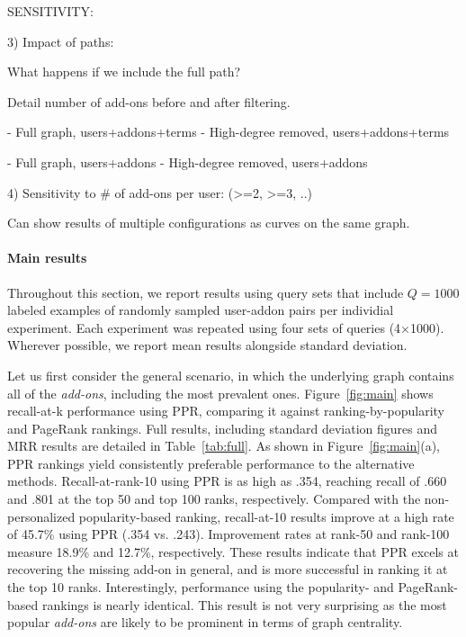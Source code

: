 \documentclass[11pt,oneside]{book}
\begin{document}
SENSITIVITY:

3) Impact of paths:

What happens if we include the full path?

Detail number of add-ons before and after filtering. 

- Full graph, users+addons+terms
- High-degree removed, users+addons+terms

- Full graph, users+addons
- High-degree removed, users+addons

4) Sensitivity to # of add-ons per user: (>=2, >=3, ..)

Can show results of multiple configurations as curves on the same graph.
\fi

\paragraph{Main results}

Throughout this section, we report results using query sets that include $Q=1000$ labeled examples of randomly sampled user-addon pairs per individial experiment. Each experiment was repeated using four sets of queries (4$\times$1000). Wherever possible, we report mean results alongside standard deviation.  

Let us first consider the general scenario, in which the underlying graph contains all of the {\it add-ons}, including the most prevalent ones. Figure~\ref{fig:main} shows recall-at-k performance using PPR, comparing it against ranking-by-popularity and PageRank rankings. Full results, including standard deviation figures and MRR results are detailed in Table~\ref{tab:full}.
As shown in Figure~\ref{fig:main}(a), PPR rankings yield consistently preferable performance to the alternative methods. Recall-at-rank-10 using PPR is as high as .354, reaching recall of .660 and .801 at the top 50 and top 100 ranks, respectively. Compared with the non-personalized popularity-based ranking, recall-at-10 results improve at a high rate of 45.7\% using PPR (.354 vs. .243). Improvement rates at rank-50 and rank-100 measure 18.9\% and 12.7\%, respectively. These results indicate that PPR excels at recovering the missing add-on in general, and is more successful in ranking it at the top 10 ranks.  Interestingly, performance using the popularity- and PageRank-based rankings is nearly identical. This result is not very surprising as the most popular {\it add-ons} are likely to be prominent in terms of graph centrality. 
\end{document}
